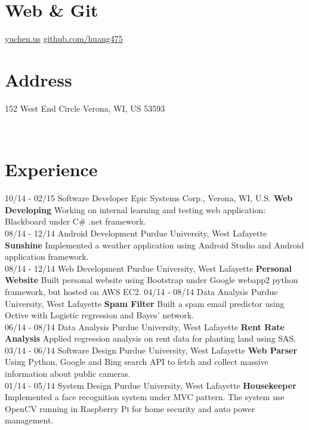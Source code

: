 \documentclass[]{friggeri-cv}
\begin{document}
\begin{aside}
  \section{Web \& Git}
    \href{http://www.yuchen.us}{yuchen.us}
    \href{https://github.com/huang475}{github.com/huang475}
    ~
  \section{Address}
    152 West End Circle
    Verona, WI, US 53593
    ~
\end{aside}
~
~
~
\section{Experience}
\begin{entrylist}
  \entry
    {10/14 - 02/15}
    {Software Developer}
    {Epic Systems Corp., Verona, WI, U.S.}
    {\textbf{Web Developing} Working on internal learning and testing web application: Blackboard under C\# .net framework. \\}
  \entry
    {08/14 - 12/14}
    {Android Development}
    {Purdue University, West Lafayette}
    {\textbf{Sunshine} Implemented a weather application using Android Studio and Android application framework.\\}
  \entry
    {08/14 - 12/14}
    {Web Development}
    {Purdue University, West Lafayette}
    {\textbf{Personal Website} Built personal website using Bootstrap under Google webapp2 python framework, but hosted on AWS EC2.}
  \entry
  	{04/14 - 08/14}
  	{Data Analysis}
  	{Purdue University, West Lafayette}
  	{\textbf{Spam Filter} Built a spam email predictor using Octive with Logistic regression and Bayes' network.\\} 
  \entry
  	{06/14 - 08/14}
  	{Data Analysis}
  	{Purdue University, West Lafayette}
  	{\textbf{Rent Rate Analysis} Applied regression analysis on rent data for planting land using SAS.\\} 
  \entry
    {03/14 - 06/14}
    {Software Design}
    {Purdue University, West Lafayette}
    {\textbf{Web Parser} Using Python, Google and Bing search API to fetch and collect massive information about public cameras.\\}
  \entry
    {01/14 - 05/14}
    {System Design}
    {Purdue University, West Lafayette}
    {\textbf{Housekeeper} Implemented a face recognition system under MVC pattern. The system use OpenCV running in Raspberry Pi for home security and auto power management.\\}

\end{entrylist}
\end{document}
